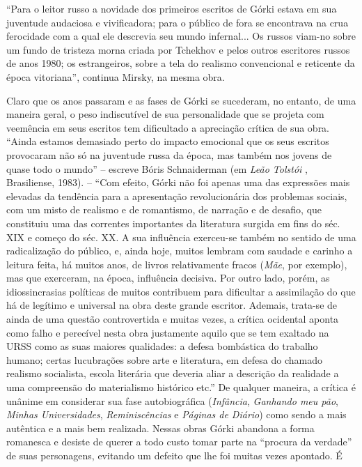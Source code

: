 ``Para o leitor russo a novidade dos primeiros escritos de Górki estava
em sua juventude audaciosa e vivificadora; para o público de fora se
encontrava na crua ferocidade com a qual ele descrevia seu mundo
infernal... Os russos viam-no sobre um fundo de tristeza morna criada
por Tchekhov e pelos outros escritores russos de anos 1980; os
estrangeiros, sobre a tela do realismo convencional e reticente da época
vitoriana'', continua Mirsky, na mesma obra.

Claro que os anos passaram e as fases de Górki se sucederam, no entanto,
de uma maneira geral, o peso indiscutível de sua personalidade que se
projeta com veemência em seus escritos tem dificultado a apreciação
crítica de sua obra. ``Ainda estamos demasiado perto do impacto
emocional que os seus escritos provocaram não só na juventude russa da
época, mas também nos jovens de quase todo o mundo'' -- escreve Bóris
Schnaiderman (em \emph{Leão Tolstói} , Brasiliense, 1983). -- ``Com
efeito, Górki não foi apenas uma das expressões mais elevadas da
tendência para a apresentação revolucionária dos problemas sociais, com
um misto de realismo e de romantismo, de narração e de desafio, que
constituiu uma das correntes importantes da literatura surgida em fins
do séc. XIX e começo do séc. XX. A sua influência exerceu-se também no
sentido de uma radicalização do público, e, ainda hoje, muitos lembram
com saudade e carinho a leitura feita, há muitos anos, de livros
relativamente fracos (\emph{Mãe}, por exemplo), mas que exerceram, na
época, influência decisiva. Por outro lado, porém, as idiossincrasias
políticas de muitos contribuem para dificultar a assimilação do que há
de legítimo e universal na obra deste grande escritor. Ademais, trata-se
de ainda de uma questão controvertida e muitas vezes, a crítica
ocidental aponta como falho e perecível nesta obra justamente aquilo que
se tem exaltado na URSS como as suas maiores qualidades: a defesa
bombástica do trabalho humano; certas lucubrações sobre arte e
literatura, em defesa do chamado realismo socialista, escola literária
que deveria aliar a descrição da realidade a uma compreensão do
materialismo histórico etc.'' De qualquer maneira, a crítica é unânime
em considerar sua fase autobiográfica (\emph{Infância}, \emph{Ganhando
meu pão}, \emph{Minhas Universidades}, \emph{Reminiscências} e
\emph{Páginas de Diário}) como sendo a mais autêntica e a mais bem
realizada. Nessas obras Górki abandona a forma romanesca e desiste de
querer a todo custo tomar parte na ``procura da verdade'' de suas
personagens, evitando um defeito que lhe foi muitas vezes apontado. É
